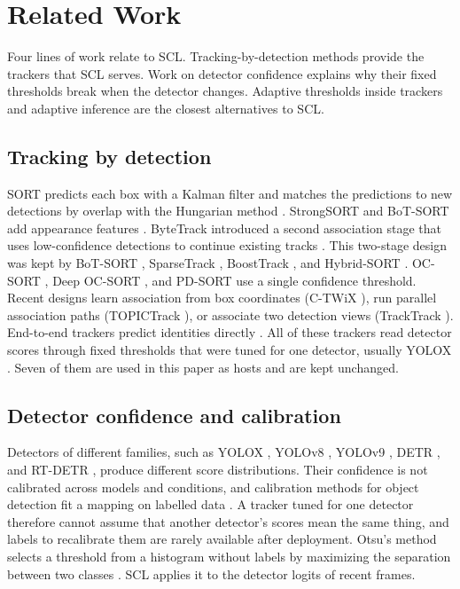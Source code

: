 \documentclass[pdflatex,sn-mathphys-num,iicol]{sn-jnl}
\newcommand{\scl}{SCL}
\begin{document}
\section{Related Work}\label{sec:related}

Four lines of work relate to \scl{}. Tracking-by-detection methods provide the
trackers that \scl{} serves. Work on detector confidence explains why their
fixed thresholds break when the detector changes. Adaptive thresholds inside
trackers and adaptive inference are the closest alternatives to \scl{}.

\subsection{Tracking by detection}
SORT predicts each box with a Kalman filter and matches the predictions to new
detections by overlap with the Hungarian method \cite{bewley2016sort}.
StrongSORT and BoT-SORT add appearance features
\cite{du2023strongsort,aharon2022botsort}. ByteTrack
introduced a second association stage that uses low-confidence detections to
continue existing tracks \cite{zhang2022bytetrack}. This two-stage design was
kept by BoT-SORT \cite{aharon2022botsort}, SparseTrack \cite{liu2025sparsetrack},
BoostTrack \cite{stanojevic2024boosttrack}, and Hybrid-SORT
\cite{yang2024hybridsort}. OC-SORT \cite{cao2023ocsort}, Deep OC-SORT
\cite{maggiolino2023deepocsort}, and PD-SORT \cite{wang2025pdsort} use a single
confidence threshold. Recent designs learn association from box coordinates
(C-TWiX \cite{miah2025twix}), run parallel association paths (TOPICTrack
\cite{cao2025topictrack}), or associate two detection views (TrackTrack
\cite{shim2025tracktrack}). End-to-end trackers predict identities directly
\cite{zeng2022motr,gao2025motip}. All of these trackers read detector scores
through fixed thresholds that were tuned for one detector, usually YOLOX
\cite{ge2021yolox}. Seven of them are used in this paper as hosts and are kept
unchanged.

\subsection{Detector confidence and calibration}
Detectors of different families, such as YOLOX \cite{ge2021yolox}, YOLOv8
\cite{jocher2023yolov8}, YOLOv9 \cite{wang2024yolov9}, DETR
\cite{carion2020detr}, and RT-DETR
\cite{zhao2024rtdetr}, produce different score distributions. Their confidence
is not calibrated across models and conditions, and calibration methods for
object detection fit a mapping on labelled data \cite{kuppers2020detcalib}.
A tracker tuned for one detector therefore cannot assume that another
detector's scores mean the same thing, and labels to recalibrate them are
rarely available after deployment. Otsu's method selects a threshold from a histogram without labels by
maximizing the separation between two classes \cite{otsu1979}. \scl{}
applies it to the detector logits of recent frames.
\end{document}
